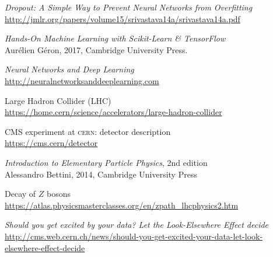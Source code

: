 \begin{thebibliography}{99}
\textit{Dropout: A Simple Way to Prevent Neural Networks from Overfitting}
\\\url{http://jmlr.org/papers/volume15/srivastava14a/srivastava14a.pdf}

\textit{Hands-On Machine Learning with Scikit-Learn \& TensorFlow}
\\Aurélien Géron, 2017, Cambridge University Press.

\textit{Neural Networks and Deep Learning}
\\\url{http://neuralnetworksanddeeplearning.com}

Large Hadron Collider (LHC)
\\\url{https://home.cern/science/accelerators/large-hadron-collider}

CMS experiment at \textsc{cern}: detector description
\\\url{https://cms.cern/detector}

\textit{Introduction to Elementary Particle Physics}, 2nd edition
\\Alessandro Bettini, 2014, Cambridge University Press

Decay of $Z$ bosons
\\\url{https://atlas.physicsmasterclasses.org/en/zpath_lhcphysics2.htm}

\textit{Should you get excited by your data? Let the Look-Elsewhere Effect decide}
\\\url{http://cms.web.cern.ch/news/should-you-get-excited-your-data-let-look-elsewhere-effect-decide}
\end{thebibliography}